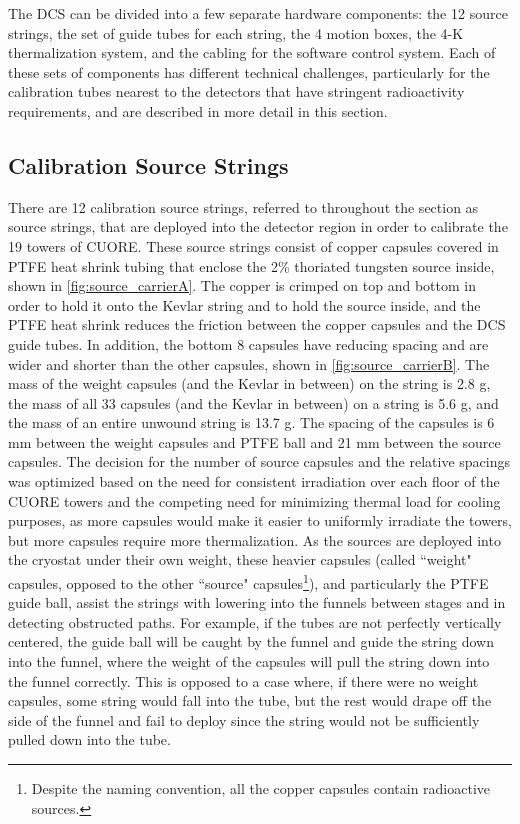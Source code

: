 The DCS can be divided into a few separate hardware components: the 12 source strings, the set of guide tubes for each string, the 4 motion boxes, the 4-K thermalization system, and the cabling for the software control system.
Each of these sets of components has different technical challenges, particularly for the calibration tubes nearest to the detectors that have stringent radioactivity requirements, and are described in more detail in this section.

\subsection*{Calibration Source Strings}
There are 12 calibration source strings, referred to throughout the section as source strings, that are deployed into the detector region in order to calibrate the 19 towers of CUORE.
These source strings consist of copper capsules covered in PTFE heat shrink tubing that enclose the 2\% thoriated tungsten source inside, shown in \autoref{fig:source_carrierA}.
The copper is crimped on top and bottom in order to hold it onto the Kevlar string and to hold the source inside, and the PTFE heat shrink reduces the friction between the copper capsules and the DCS guide tubes. In addition, the bottom 8 capsules have reducing spacing and are wider and shorter than the other capsules, shown in \autoref{fig:source_carrierB}.
The mass of the weight capsules (and the Kevlar in between) on the string is 2.8 g, the mass of all 33 capsules (and the Kevlar in between) on a string is 5.6 g, and the mass of an entire unwound string is 13.7 g.
The spacing of the capsules is 6 mm between the weight capsules and PTFE ball and 21 mm between the source capsules.
The decision for the number of source capsules and the relative spacings was optimized based on the need for consistent irradiation over each floor of the CUORE towers and the competing need for minimizing thermal load for cooling purposes, as more capsules would make it easier to uniformly irradiate the towers, but more capsules require more thermalization.
As the sources are deployed into the cryostat under their own weight, these heavier capsules (called ``weight" capsules, opposed to the other ``source" capsules\footnote{Despite the naming convention, all the copper capsules contain radioactive sources.}), and particularly the PTFE guide ball, assist the strings with lowering into the funnels between stages and in detecting obstructed paths.
For example, if the tubes are not perfectly vertically centered, the guide ball will be caught by the funnel and guide the string down into the funnel, where the weight of the capsules will pull the string down into the funnel correctly.
This is opposed to a case where, if there were no weight capsules, some string would fall into the tube, but the rest would drape off the side of the funnel and fail to deploy since the string would not be sufficiently pulled down into the tube.

